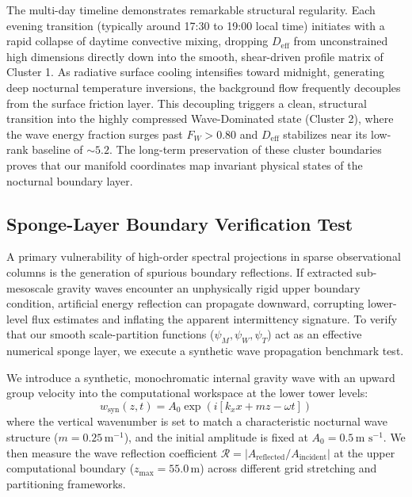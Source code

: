 The multi-day timeline demonstrates remarkable structural regularity. Each evening transition (typically around 17:30 to 19:00 local time) initiates with a rapid collapse of daytime convective mixing, dropping $D_{\mathrm{eff}}$ from unconstrained high dimensions directly down into the smooth, shear-driven profile matrix of Cluster 1. As radiative surface cooling intensifies toward midnight, generating deep nocturnal temperature inversions, the background flow frequently decouples from the surface friction layer. This decoupling triggers a clean, structural transition into the highly compressed Wave-Dominated state (Cluster 2), where the wave energy fraction surges past $F_W > 0.80$ and $D_{\mathrm{eff}}$ stabilizes near its low-rank baseline of $\sim 5.2$. The long-term preservation of these cluster boundaries proves that our manifold coordinates map invariant physical states of the nocturnal boundary layer.

\subsection{Sponge-Layer Boundary Verification Test}
\label{sec:results:sponge}

A primary vulnerability of high-order spectral projections in sparse observational columns is the generation of spurious boundary reflections. If extracted sub-mesoscale gravity waves encounter an unphysically rigid upper boundary condition, artificial energy reflection can propagate downward, corrupting lower-level flux estimates and inflating the apparent intermittency signature. To verify that our smooth scale-partition functions ($\psi_M, \psi_W, \psi_T$) act as an effective numerical sponge layer, we execute a synthetic wave propagation benchmark test.

We introduce a synthetic, monochromatic internal gravity wave with an upward group velocity into the computational workspace at the lower tower levels:
\begin{equation}
w_{\mathrm{syn}}(z, t) = A_0 \exp(i [k_x x + m z - \omega t])
\label{eq:wave_syn}
\end{equation}
where the vertical wavenumber is set to match a characteristic nocturnal wave structure ($m = 0.25\,\text{m}^{-1}$), and the initial amplitude is fixed at $A_0 = 0.5\,\text{m s}^{-1}$. We then measure the wave reflection coefficient $\mathcal{R} = |A_{\mathrm{reflected}} / A_{\mathrm{incident}}|$ at the upper computational boundary ($z_{\max} = 55.0\,\text{m}$) across different grid stretching and partitioning frameworks.

